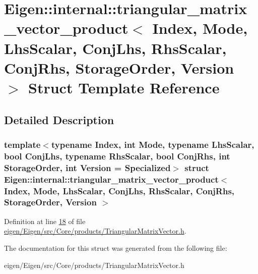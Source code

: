 \hypertarget{struct_eigen_1_1internal_1_1triangular__matrix__vector__product}{}\section{Eigen\+:\+:internal\+:\+:triangular\+\_\+matrix\+\_\+vector\+\_\+product$<$ Index, Mode, Lhs\+Scalar, Conj\+Lhs, Rhs\+Scalar, Conj\+Rhs, Storage\+Order, Version $>$ Struct Template Reference}
\label{struct_eigen_1_1internal_1_1triangular__matrix__vector__product}


\subsection{Detailed Description}
\subsubsection*{template$<$typename Index, int Mode, typename Lhs\+Scalar, bool Conj\+Lhs, typename Rhs\+Scalar, bool Conj\+Rhs, int Storage\+Order, int Version = Specialized$>$\newline
struct Eigen\+::internal\+::triangular\+\_\+matrix\+\_\+vector\+\_\+product$<$ Index, Mode, Lhs\+Scalar, Conj\+Lhs, Rhs\+Scalar, Conj\+Rhs, Storage\+Order, Version $>$}



Definition at line \hyperlink{eigen_2_eigen_2src_2_core_2products_2_triangular_matrix_vector_8h_source_l00018}{18} of file \hyperlink{eigen_2_eigen_2src_2_core_2products_2_triangular_matrix_vector_8h_source}{eigen/\+Eigen/src/\+Core/products/\+Triangular\+Matrix\+Vector.\+h}.



The documentation for this struct was generated from the following file\+:\begin{DoxyCompactItemize}
\item 
eigen/\+Eigen/src/\+Core/products/\+Triangular\+Matrix\+Vector.\+h\end{DoxyCompactItemize}
